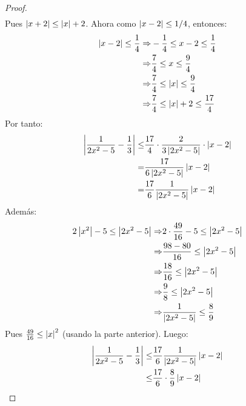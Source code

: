 \documentclass[12pt]{article}
\begin{document}
\begin{enumerate}
\begin{proof}
\begin{equation*}
\begin{split}
            \end{split}
        \end{equation*}
        Pues $\left| x+2 \right|\leq\left| x \right|+2$. Ahora como $\left| x-2 \right|\leq1/4$, entonces:
        \begin{equation*}
            \begin{split}
                \left| x-2 \right|\leq\frac{1}{4}\Rightarrow&-\frac{1}{4}\leq x-2\leq\frac{1}{4}\\
                \Rightarrow&\frac{7}{4}\leq x\leq\frac{9}{4}\\
                \Rightarrow&\frac{7}{4}\leq \left| x \right|\leq\frac{9}{4}\\
                \Rightarrow&\frac{7}{4}\leq \left| x \right|+2\leq\frac{17}{4}
            \end{split}
        \end{equation*}
        Por tanto:
        \begin{equation*}
            \begin{split}
                \left| \frac{1}{2x^2-5}-\frac{1}{3} \right|\leq&\frac{17}{4}\cdot\frac{2}{3\left| 2x^2-5 \right|}\cdot\left| x-2 \right|\\
                =&\frac{17}{6\left| 2x^2-5 \right|}\left| x-2 \right|\\
                =&\frac{17}{6}\frac{1}{\left| 2x^2-5 \right|}\left| x-2 \right|
            \end{split}
        \end{equation*}
        Además:
        \begin{equation*}
            \begin{split}
                2\left| x^2 \right|-5\leq\left| 2x^2-5 \right|\Rightarrow&2\cdot\frac{49}{16}-5\leq\left| 2x^2-5 \right|\\
                \Rightarrow&\frac{98-80}{16}\leq\left| 2x^2-5 \right|\\
                \Rightarrow&\frac{18}{16}\leq\left| 2x^2-5 \right|\\
                \Rightarrow&\frac{9}{8}\leq\left| 2x^2-5 \right|\\
                \Rightarrow&\frac{1}{\left| 2x^2-5 \right|}\leq\frac{8}{9}
            \end{split}
        \end{equation*}
        Pues $\frac{49}{16}\leq\left| x \right|^2$ (usando la parte anterior). Luego:
        \begin{equation*}
            \begin{split}
                \abs{\frac{1}{2x^2-5}-\frac{1}{3}}\leq&\frac{17}{6}\frac{1}{\abs{2x^2-5}}\abs{x-2}\\
                \leq&\frac{17}{6}\cdot\frac{8}{9}\abs{x-2}\\

\end{split}
\end{equation*}
\end{proof}
\end{enumerate}
\end{document}

